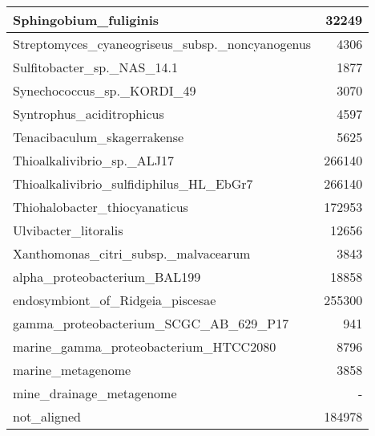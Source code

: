\documentclass[12pt,a4paper]{article}
\begin{document}
\begin{table}[ht]
\begin{center}
\begin{tabular}{|l*{1}{|r}|}
Sphingobium\_fuliginis & 32249 \\ \hline
Streptomyces\_cyaneogriseus\_subsp.\_noncyanogenus & 4306 \\ \hline
Sulfitobacter\_sp.\_NAS\_14.1 & 1877 \\ \hline
Synechococcus\_sp.\_KORDI\_49 & 3070 \\ \hline
Syntrophus\_aciditrophicus & 4597 \\ \hline
Tenacibaculum\_skagerrakense & 5625 \\ \hline
Thioalkalivibrio\_sp.\_ALJ17 & 266140 \\ \hline
Thioalkalivibrio\_sulfidiphilus\_HL\_EbGr7 & 266140 \\ \hline
Thiohalobacter\_thiocyanaticus & 172953 \\ \hline
Ulvibacter\_litoralis & 12656 \\ \hline
Xanthomonas\_citri\_subsp.\_malvacearum & 3843 \\ \hline
alpha\_proteobacterium\_BAL199 & 18858 \\ \hline
endosymbiont\_of\_Ridgeia\_piscesae & 255300 \\ \hline
gamma\_proteobacterium\_SCGC\_AB\_629\_P17 & 941 \\ \hline
marine\_gamma\_proteobacterium\_HTCC2080 & 8796 \\ \hline
marine\_metagenome & 3858 \\ \hline
mine\_drainage\_metagenome & - \\ \hline
not\_aligned & 184978 \\ \hline
\end{tabular}
\end{center}
\end{table}
\end{document}
